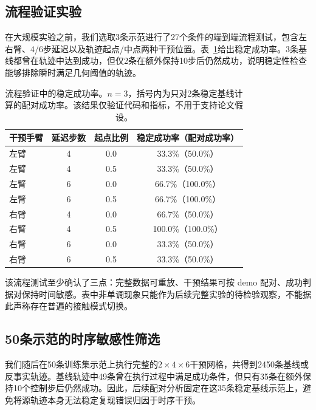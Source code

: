 \subsection{流程验证实验}

在大规模实验之前，我们选取3条示范进行了27个条件的端到端流程测试，包含左右臂、4/6步延迟以及轨迹起点/中点两种干预位置。表~\ref{tab:pilot}给出稳定成功率。3条基线都曾在轨迹中达到成功，但仅2条在额外保持10步后仍然成功，说明稳定性检查能够排除瞬时满足几何阈值的轨迹。

\begin{table}[t]
\centering
\caption{流程验证中的稳定成功率。$n=3$，括号内为只对2条稳定基线计算的配对成功率。该结果仅验证代码和指标，不用于支持论文假设。}
\label{tab:pilot}
\begin{tabular}{lccc}
\toprule
干预手臂 & 延迟步数 & 起点比例 & 稳定成功率（配对成功率） \\
\midrule
左臂 & 4 & 0.0 & 33.3\%（50.0\%） \\
左臂 & 4 & 0.5 & 33.3\%（50.0\%） \\
左臂 & 6 & 0.0 & 66.7\%（100.0\%） \\
左臂 & 6 & 0.5 & 66.7\%（100.0\%） \\
右臂 & 4 & 0.0 & 66.7\%（50.0\%） \\
右臂 & 4 & 0.5 & 100.0\%（100.0\%） \\
右臂 & 6 & 0.0 & 33.3\%（50.0\%） \\
右臂 & 6 & 0.5 & 33.3\%（50.0\%） \\
\bottomrule
\end{tabular}
\end{table}

该流程测试至少确认了三点：完整数据可重放、干预结果可按 demo 配对、成功判据对保持时间敏感。表中非单调现象只能作为后续完整实验的待检验观察，不能据此声称存在普遍的接触模式切换。

\subsection{50条示范的时序敏感性筛选}

我们随后在50条训练集示范上执行完整的$2\times4\times6$干预网格，共得到2450条基线或反事实轨迹。基线轨迹中49条曾在执行过程中满足成功条件，但只有35条在额外保持10个控制步后仍然成功。因此，后续配对分析固定在这35条稳定基线示范上，避免将源轨迹本身无法稳定复现错误归因于时序干预。

